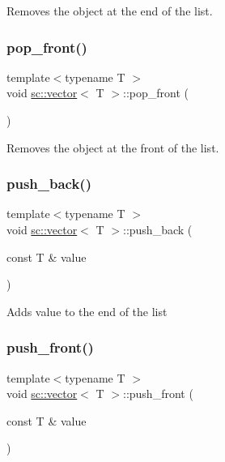 Removes the object at the end of the list. \mbox{\label{classsc_1_1vector_aad4717b5827454557f7c9e5c3edd5a7e}} 
\subsubsection{\texorpdfstring{pop\+\_\+front()}{pop\_front()}}
{\footnotesize\ttfamily template$<$typename T $>$ \\
void \hyperlink{classsc_1_1vector}{sc\+::vector}$<$ T $>$\+::pop\+\_\+front (\begin{DoxyParamCaption}{ }\end{DoxyParamCaption})\hspace{0.3cm}{\ttfamily [inline]}}

Removes the object at the front of the list. \mbox{\label{classsc_1_1vector_a5b4a8c72d19d0bdab794e495fb1e334d}} 
\subsubsection{\texorpdfstring{push\+\_\+back()}{push\_back()}}
{\footnotesize\ttfamily template$<$typename T $>$ \\
void \hyperlink{classsc_1_1vector}{sc\+::vector}$<$ T $>$\+::push\+\_\+back (\begin{DoxyParamCaption}\item[{const T \&}]{value }\end{DoxyParamCaption})\hspace{0.3cm}{\ttfamily [inline]}}

Adds value to the end of the list \mbox{\label{classsc_1_1vector_a013daac15aada32590d4372c0cbc610a}} 
\subsubsection{\texorpdfstring{push\+\_\+front()}{push\_front()}}
{\footnotesize\ttfamily template$<$typename T $>$ \\
void \hyperlink{classsc_1_1vector}{sc\+::vector}$<$ T $>$\+::push\+\_\+front (\begin{DoxyParamCaption}\item[{const T \&}]{value }\end{DoxyParamCaption})\hspace{0.3cm}{\ttfamily [inline]}}

